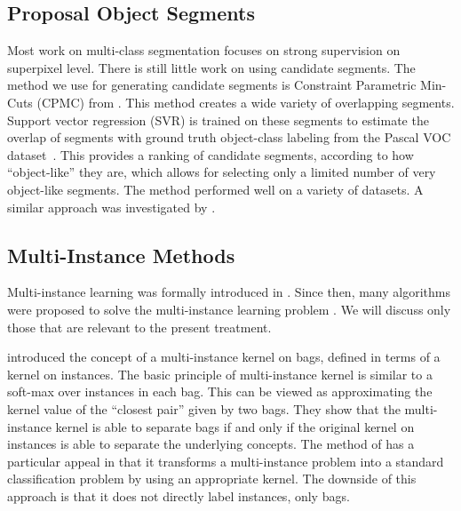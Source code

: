 \subsection{Proposal Object Segments}\label{related_segments}
Most work on multi-class segmentation focuses on strong supervision on superpixel level. There is still little work on using candidate segments.
The method we use for generating candidate segments is Constraint Parametric Min-Cuts (CPMC) from \citet{carreira2010constrained}.
This method creates a wide variety of overlapping segments. Support vector regression (SVR) is trained on these segments
to estimate the overlap of segments with ground truth object-class labeling
from the Pascal VOC dataset~\citep{pascal}. This provides a ranking of candidate segments, according to how ``object-like'' they are, which
allows for selecting only a limited number of very object-like segments.
The method performed well on a variety of datasets.
A similar approach was investigated by \citet{endres2010category}.

\subsection{Multi-Instance Methods}
Multi-instance learning was formally introduced in \citet{dietterich1997solving}.
Since then, many algorithms were proposed to solve the multi-instance learning problem
\citep{andrews2003support,gaertner2002multi,zhou2009multi,li2009convex,zhang2002dd,mangasarian2008multiple,leistner2010miforests,chen2006miles}.
We will discuss only those that are relevant to the present treatment.

\citet{gaertner2002multi} introduced the concept of a multi-instance
kernel on bags, defined in terms of a kernel on instances. 
The basic principle of multi-instance kernel is similar to a soft-max over instances in
each bag. This can be viewed as approximating the kernel value of the ``closest pair'' given by two bags. They show that the multi-instance kernel
is able to separate bags if and only if the original kernel on instances is able to separate the underlying concepts.
The method of \citet{gaertner2002multi} has a particular appeal in that it transforms a multi-instance problem into a standard
classification problem by using an appropriate kernel. The downside of this approach is that it does
not directly label instances, only bags.


